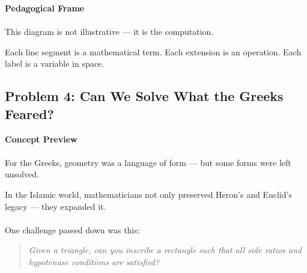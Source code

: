 \documentclass[9pt]{article}
\begin{document}
\vspace{1em}

\textbf{Pedagogical Frame} \\\\
This diagram is not illustrative — it is the computation.

Each line segment is a mathematical term. Each extension is an operation. Each label is a variable in space.

\vspace{1em}

\begin{center}
\end{center}


\newpage

\subsection*{Problem 4: Can We Solve What the Greeks Feared?}

\textbf{Concept Preview} \\\\
For the Greeks, geometry was a language of form — but some forms were left unsolved.

In the Islamic world, mathematicians not only preserved Heron's and Euclid’s legacy — they expanded it. \\\\
One challenge passed down was this:

\begin{quote}
\itshape
Given a triangle, can you inscribe a rectangle such that all side ratios and hypotenuse conditions are satisfied?
\end{quote}
\end{document}
